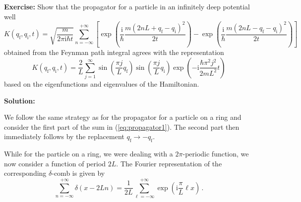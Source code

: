 \documentclass[11pt,DIV=19,parskip=half]{scrartcl}
\begin{document}


\vspace{0.5truecm}
\textbf{Exercise:} Show that the propagator for a particle in an infinitely deep potential well
\begin{equation}
 \label{eq:propagator1}
 K(q_\text{f}, q_\text{i}, t) = \sqrt{\frac{m}{2\pi\text{i}\hbar t}}\sum_{n=-\infty}^{+\infty}
  \left[\exp\!\left(\frac{\text{i}}{\hbar}\frac{m(2nL+q_\text{f}-q_\text{i})^2}{2t}\right)
  -\exp\!\left(\frac{\text{i}}{\hbar}\frac{m(2nL-q_\text{f}-q_\text{i})^2}{2t}\right)\right]
\end{equation}
obtained from the Feynman path integral agrees with the representation
\begin{equation}
 \label{eq:propagator2}
 K(q_\text{f}, q_\text{i}, t) = \frac{2}{L}\sum_{j=1}^{\infty}
        \sin\!\left(\frac{\pi j}{L}q_\text{f}\right)\sin\!\left(\frac{\pi j}{L}q_\text{i}\right)
   \exp\left(-\text{i}\frac{\hbar\pi^2j^2}{2mL^2}t\right)
\end{equation}
based on the eigenfunctions and eigenvalues of the Hamiltonian.

\vspace{0.5truecm}
\textbf{Solution:}

We follow the same strategy as for the propagator for a particle on a ring and consider the
first part of the sum in (\ref{eq:propagator1}). The second part then immediately follows by
the replacement $q_\text{f}\to-q_\text{f}$.

While for the particle on a ring, we were
dealing with a $2\pi$-periodic function, we now consider a function of period $2L$. The Fourier
representation of the corresponding $\delta$-comb is given by
\begin{equation}
 \sum_{n=-\infty}^{+\infty}\delta(x-2Ln) = \frac{1}{2L}\sum_{\ell=-\infty}^{+\infty}
                                              \exp\!\left(\text{i}\frac{\pi}{L}\ell x\right)\,.
\end{equation}
\end{document}
